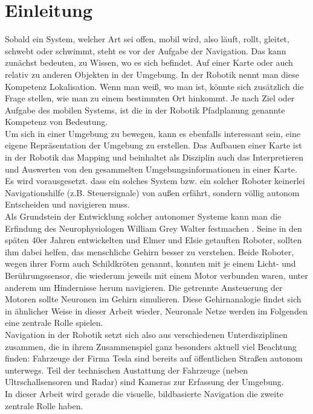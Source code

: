 %
\chapter{Einleitung}
Sobald ein System, welcher Art sei offen, mobil wird, also läuft, rollt, gleitet, schwebt oder schwimmt, steht es vor der Aufgabe der Navigation. Das kann zunächst bedeuten, zu Wissen, wo es sich befindet. Auf einer Karte oder auch relativ zu anderen Objekten in der Umgebung. In der Robotik nennt man diese Kompetenz Lokalisation. Wenn man weiß, wo man ist, könnte sich zusätzlich die Frage stellen, wie man zu einem bestimmten Ort hinkommt. Je nach Ziel oder Aufgabe des mobilen Systems, ist die in der Robotik Pfadplanung genannte Kompetenz von Bedeutung.\\ Um sich in einer Umgebung zu bewegen, kann es ebenfalls interessant sein, eine eigene Repräsentation der Umgebung zu erstellen. Das Aufbauen einer Karte ist in der Robotik das Mapping und beinhaltet als Disziplin auch das Interpretieren und Auswerten von den gesammelten Umgebungsinformationen in einer Karte.\\
Es wird vorausgesetzt. dass ein solches System bzw. ein solcher Roboter keinerlei Navigationshilfe (z.B. Steuersignale) von außen erfährt, sondern völlig autonom Entscheiden und navigieren muss.\\
Als Grundstein der Entwicklung solcher autonomer Systeme kann man die Erfindung des Neurophysiologen William Grey Walter festmachen \cite{walter1950imitation}. Seine in den späten 40er Jahren entwickelten und \glqq Elmer \grqq{} und \glqq Elsie\grqq{} getauften Roboter, sollten ihm dabei helfen, das menschliche Gehirn besser zu verstehen. Beide Roboter, wegen ihrer Form auch Schildkröten genannt, konnten mit je einem Licht- und Berührungssensor, die wiederum jeweils mit einem Motor verbunden waren, unter anderem um Hindernisse herum navigieren. Die getrennte Ansteuerung der Motoren sollte Neuronen im Gehirn simulieren. Diese Gehirnanalogie findet sich in ähnlicher Weise in dieser Arbeit wieder, Neuronale Netze werden im Folgenden eine zentrale Rolle spielen.\\
Navigation in der Robotik setzt sich also aus verschiedenen Unterdisziplinen zusammen, die in ihrem Zusammenspiel ganz besonders aktuell viel Beachtung finden: Fahrzeuge der Firma Tesla sind bereits auf öffentlichen Straßen autonom unterwegs. Teil der technischen Austattung der Fahrzeuge (neben Ultrschallsensoren und Radar) sind Kameras zur Erfassung der Umgebung. \\
In dieser Arbeit wird gerade die visuelle, bildbasierte Navigation die zweite zentrale Rolle haben.


